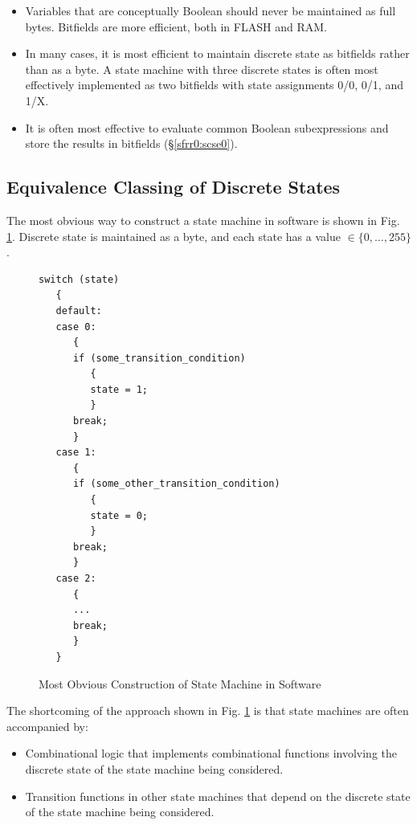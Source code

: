 \documentclass[letterpaper,10pt,titlepage]{article}
\begin{document}
\begin{itemize}
\item Variables that are conceptually Boolean should never be
      maintained as full bytes.  Bitfields are more efficient, both
      in FLASH and RAM.
\item In many cases, it is most efficient to maintain discrete state as
      bitfields rather than as a byte.  A state machine with three
      discrete states is often most effectively implemented as two
      bitfields with state assignments 0/0, 0/1, and 1/X.
\item It is often most effective to evaluate common Boolean subexpressions and store
      the results in bitfields (\S{}\ref{sfrr0:scse0}).
\end{itemize}



\subsection{Equivalence Classing of Discrete States}
\label{sfrr0:secd0}

The most obvious way to construct a state machine in software is shown in
Fig. \ref{fig:sfrr0:secd0:00}.  Discrete state is maintained
as a byte, and each state has a value $\in \{0, \ldots{}, 255\}$.

\begin{figure}
\begin{small}
\begin{verbatim}
switch (state)
   {
   default:
   case 0:
      {
      if (some_transition_condition)
         {
         state = 1;
         }
      break;
      }
   case 1:
      {
      if (some_other_transition_condition)
         {
         state = 0;
         }
      break;
      }
   case 2:
      {
      ...
      break;
      }
   }
\end{verbatim}
\end{small}
\caption{Most Obvious Construction of State Machine in Software}
\label{fig:sfrr0:secd0:00}
\end{figure}

The shortcoming of the approach shown in Fig. \ref{fig:sfrr0:secd0:00} is that
state machines are often accompanied by:

\begin{itemize}
\item Combinational logic that implements combinational functions involving
      the discrete state of the state machine being considered.
\item Transition functions in other state machines that depend on the discrete
      state of the state machine being considered.
\end{itemize}
\end{document}
